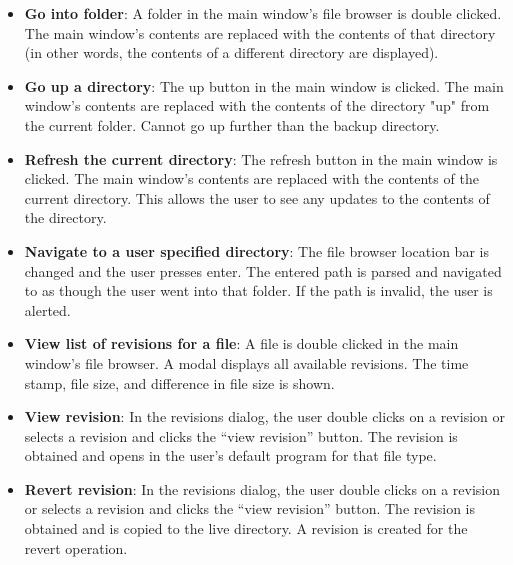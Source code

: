 \documentclass[12pt,a4paper]{article}
\begin{document}
\begin{itemize}
\item \textbf{Go into folder}: A folder in the main window's file browser is double clicked. The main window's contents are replaced with the contents of that directory (in other words, the contents of a different directory are displayed).
\item \textbf{Go up a directory}: The up button in the main window is clicked. The main window's contents are replaced with the contents of the directory "up" from the current folder. Cannot go up further than the backup directory.
\item \textbf{Refresh the current directory}: The refresh button in the main window is clicked. The main window's contents are replaced with the contents of the current directory. This allows the user to see any updates to the contents of the directory.
\item \textbf{Navigate to a user specified directory}: The file browser location bar is changed and the user presses enter. The entered path is parsed and navigated to as though the user went into that folder. If the path is invalid, the user is alerted.
\item \textbf{View list of revisions for a file}: A file is double clicked in the main window's file browser. A modal displays all available revisions. The time stamp, file size, and difference in file size is shown.
\item \textbf{View revision}: In the revisions dialog, the user double clicks on a revision or selects a revision and clicks the ``view revision'' button. The revision is obtained and opens in the user's default program for that file type.
\item \textbf{Revert revision}: In the revisions dialog, the user double clicks on a revision or selects a revision and clicks the ``view revision'' button. The revision is obtained and is copied to the live directory. A revision is created for the revert operation.
\end{itemize}
\end{document}
